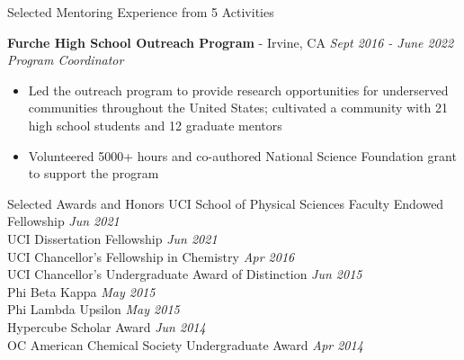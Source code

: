 \documentclass{resume} %
\begin{document}
\begin{rSection}{Selected Mentoring Experience from 5 Activities}

  {\bf Furche High School Outreach Program} - Irvine, CA \hfill {\em Sept 2016 - June 2022} \\
  {\textit{Program Coordinator}}
  \vspace{-0.5em}
  \begin{itemize}
    \itemsep-0.75em
  \item Led the outreach program to provide research opportunities for underserved communities
    throughout the United States; cultivated a community with 21 high school students and 12 graduate mentors
  \item Volunteered 5000+ hours and co-authored National Science Foundation grant to support the program
  \end{itemize}

\end{rSection}

\begin{rSection}{Selected Awards and Honors}
  UCI School of Physical Sciences Faculty Endowed Fellowship \hfill {\em Jun 2021} \\
  UCI Dissertation Fellowship \hfill {\em Jun 2021} \\
  UCI Chancellor's Fellowship in Chemistry \hfill {\em Apr 2016} \\
  UCI Chancellor's Undergraduate Award of Distinction \hfill {\em Jun 2015} \\
  Phi Beta Kappa \hfill {\em May 2015} \\
  Phi Lambda Upsilon \hfill {\em May 2015} \\
  Hypercube Scholar Award \hfill {\em Jun 2014} \\
  OC American Chemical Society Undergraduate Award \hfill {\em Apr 2014}
\end{rSection}
\end{document}
